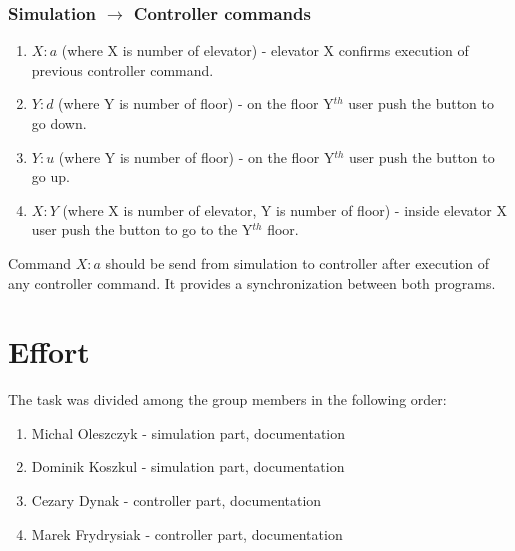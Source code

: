 \documentclass[12pt]{article}
\begin{document}
\subsubsection{Simulation \(\to\) Controller commands}
\begin{enumerate}
	\item $X:a$ (where X is number of elevator) - elevator X confirms execution of previous controller command.
	\item $Y:d$ (where Y is number of floor) - on the floor Y$^{th}$ user push the button to go down.
	\item $Y:u$ (where Y is number of floor) - on the floor Y$^{th}$ user push the button to go up.
	\item $X:Y$ (where X is number of elevator, Y is number of floor) - inside elevator X user push the button to go to the Y$^{th}$ floor.
\end{enumerate}	

Command $X:a$ should be send from simulation to controller after execution of any controller command. It provides a synchronization between both programs.

\section{Effort}
The task was divided among the group members in the following order:
\begin{enumerate}
\item Michal Oleszczyk - simulation part, documentation
\item Dominik Koszkul - simulation part, documentation
\item Cezary Dynak - controller part, documentation
\item Marek Frydrysiak - controller part, documentation
\end{enumerate}
\end{document}
